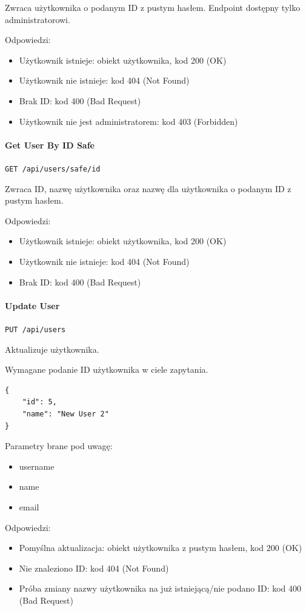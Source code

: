 \documentclass[a4paper,twoside,12pt]{book}
\begin{document}
Zwraca użytkownika o podanym ID z pustym hasłem. Endpoint dostępny tylko administratorowi.

Odpowiedzi: 
\begin{itemize}
	\item Użytkownik istnieje: obiekt użytkownika, kod 200 (OK)
	\item Użytkownik nie istnieje: kod 404 (Not Found) 
	\item Brak ID: kod 400 (Bad Request) 
	\item Użytkownik nie jest administratorem: kod 403 (Forbidden)
\end{itemize}

\paragraph{Get User By ID Safe}\label{get-user-by-id}

\texttt{GET /api/users/safe/{id}}

Zwraca ID, nazwę użytkownika oraz nazwę dla użytkownika o podanym ID z pustym hasłem.

Odpowiedzi: 
\begin{itemize}
	\item Użytkownik istnieje: obiekt użytkownika, kod 200 (OK)
	\item Użytkownik nie istnieje: kod 404 (Not Found) 
	\item Brak ID: kod 400 (Bad Request) 
\end{itemize}

\paragraph{Update User}\label{update-user}

\texttt{PUT /api/users}

Aktualizuje użytkownika.

Wymagane podanie ID użytkownika w ciele zapytania.

\begin{verbatim}
{
    "id": 5,
    "name": "New User 2"
}
\end{verbatim}

Parametry brane pod uwagę: 
\begin{itemize}
	\item  username \item  name \item  email
\end{itemize}

Odpowiedzi: 
\begin{itemize}
	\item Pomyślna aktualizacja: obiekt użytkownika z pustym hasłem, kod 200 (OK) 
	\item Nie znaleziono ID: kod 404 (Not Found) 
	\item  Próba zmiany nazwy użytkownika na już istniejącą/nie podano ID: kod 400 (Bad Request)
\end{itemize}
\end{document}
